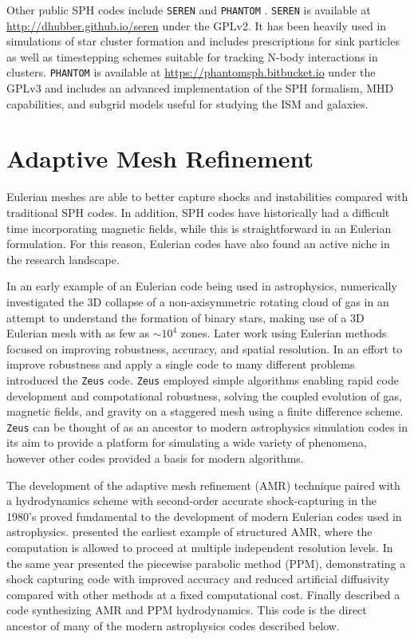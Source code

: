 \documentclass[11pt,twoside]{article}
\begin{document}
Other public SPH codes include \texttt{SEREN} \citep{hubber2011}  and \texttt{PHANTOM} \citep{price2017}. \texttt{SEREN} is available at \url{http://dhubber.github.io/seren} under the GPLv2. It has been heavily used in simulations of star cluster formation and includes prescriptions for sink particles \citep{walch2013} as well as timestepping schemes suitable for tracking N-body interactions in clusters. \texttt{PHANTOM} is available at \url{https://phantomsph.bitbucket.io} under the GPLv3 and includes an advanced implementation of the SPH formalism, MHD capabilities, and subgrid models useful for studying the ISM and galaxies.

\section{Adaptive Mesh Refinement}
\label{amr}

Eulerian meshes are able to better capture shocks and instabilities compared with traditional SPH codes. In addition, SPH codes have historically had a difficult time incorporating magnetic fields, while this is straightforward in an Eulerian formulation. For this reason, Eulerian codes have also found an active niche in the research landscape.

In an early example of an Eulerian code being used in astrophysics, \citet{boss1979} numerically investigated the 3D collapse of a non-axisymmetric rotating cloud of gas in an attempt to understand the formation of binary stars, making use of a 3D Eulerian mesh with as few as ${\sim}10^4$ zones. Later work using Eulerian methods focused on improving robustness, accuracy, and spatial resolution. In an effort to improve robustness and apply a single code to many different problems \citet{stone1992} introduced the \texttt{Zeus} code. \texttt{Zeus} employed simple algorithms enabling rapid code development and compotational robustness, solving the coupled evolution of gas, magnetic fields, and gravity on a staggered mesh using a finite difference scheme. \texttt{Zeus} can be thought of as an ancestor to modern astrophysics simulation codes in its aim to provide a platform for simulating a wide variety of phenomena, however other codes provided a basis for modern algorithms.

The development of the adaptive mesh refinement (AMR) technique paired with a hydrodynamics scheme with second-order accurate shock-capturing in the 1980's proved fundamental to the development of modern Eulerian codes used in astrophysics. \citet{berger1984} presented the earliest example of structured AMR, where the computation is allowed to proceed at multiple independent resolution levels. In the same year \citet{colella1984} presented the piecewise parabolic method (PPM), demonstrating a shock capturing code with improved accuracy and reduced artificial diffusivity compared with other methods at a fixed computational cost. Finally \citet{berger1989} described a code synthesizing AMR and PPM hydrodynamics. This code is the direct ancestor of many of the modern astrophysics codes described below.
\end{document}
